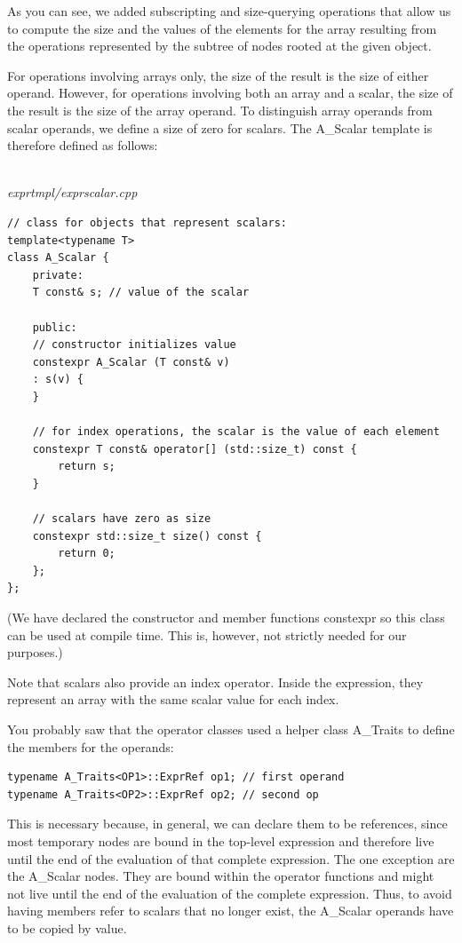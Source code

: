 As you can see, we added subscripting and size-querying operations that allow us to compute the size and the values of the elements for the array resulting from the operations represented by the subtree of nodes rooted at the given object.

For operations involving arrays only, the size of the result is the size of either operand. However, for operations involving both an array and a scalar, the size of the result is the size of the array operand. To distinguish array operands from scalar operands, we define a size of zero for scalars. The A\_Scalar template is therefore defined as follows:

\hspace*{\fill} \\ %
\noindent
\textit{exprtmpl/exprscalar.cpp}
\begin{lstlisting}[style=styleCXX]
// class for objects that represent scalars:
template<typename T>
class A_Scalar {
	private:
	T const& s; // value of the scalar
	
	public:
	// constructor initializes value
	constexpr A_Scalar (T const& v)
	: s(v) {
	}

	// for index operations, the scalar is the value of each element
	constexpr T const& operator[] (std::size_t) const {
		return s;
	}

	// scalars have zero as size
	constexpr std::size_t size() const {
		return 0;
	};
};
\end{lstlisting}

(We have declared the constructor and member functions constexpr so this class can be used at compile time. This is, however, not strictly needed for our purposes.)

Note that scalars also provide an index operator. Inside the expression, they represent an array with the same scalar value for each index.

You probably saw that the operator classes used a helper class A\_Traits to define the members for the operands:

\begin{lstlisting}[style=styleCXX]
typename A_Traits<OP1>::ExprRef op1; // first operand
typename A_Traits<OP2>::ExprRef op2; // second op
\end{lstlisting}

This is necessary because, in general, we can declare them to be references, since most temporary nodes are bound in the top-level expression and therefore live until the end of the evaluation of that complete expression. The one exception are the A\_Scalar nodes. They are bound within the operator functions and might not live until the end of the evaluation of the complete expression. Thus, to avoid having members refer to scalars that no longer exist, the A\_Scalar operands have to be copied by value.


